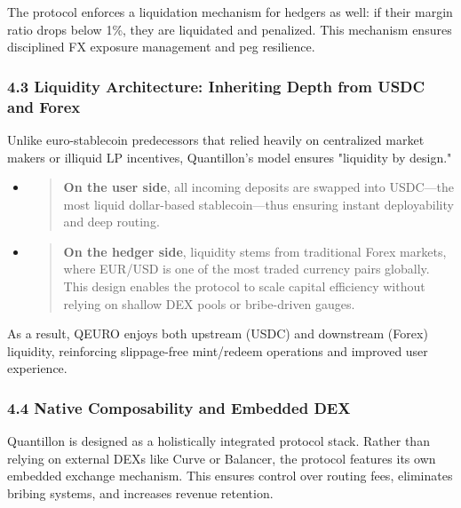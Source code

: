 The protocol enforces a liquidation mechanism for hedgers as well: if
their margin ratio drops below 1\%, they are liquidated and penalized.
This mechanism ensures disciplined FX exposure management and peg
resilience.

\hypertarget{liquidity-architecture-inheriting-depth-from-usdc-and-forex}{%
\subsubsection{4.3 Liquidity Architecture: Inheriting Depth from USDC
and
Forex}\label{liquidity-architecture-inheriting-depth-from-usdc-and-forex}}

Unlike euro-stablecoin predecessors that relied heavily on centralized
market makers or illiquid LP incentives, Quantillon's model ensures
"liquidity by design."

\begin{itemize}
\item
  \begin{quote}
  \textbf{On the user side}, all incoming deposits are swapped into
  USDC---the most liquid dollar-based stablecoin---thus ensuring instant
  deployability and deep routing.
  \end{quote}
\item
  \begin{quote}
  \textbf{On the hedger side}, liquidity stems from traditional Forex
  markets, where EUR/USD is one of the most traded currency pairs
  globally. This design enables the protocol to scale capital efficiency
  without relying on shallow DEX pools or bribe-driven gauges.
  \end{quote}
\end{itemize}

As a result, QEURO enjoys both upstream (USDC) and downstream (Forex)
liquidity, reinforcing slippage-free mint/redeem operations and improved
user experience.

\hypertarget{native-composability-and-embedded-dex}{%
\subsubsection{4.4 Native Composability and Embedded
DEX}\label{native-composability-and-embedded-dex}}

Quantillon is designed as a holistically integrated protocol stack.
Rather than relying on external DEXs like Curve or Balancer, the
protocol features its own embedded exchange mechanism. This ensures
control over routing fees, eliminates bribing systems, and increases
revenue retention.

